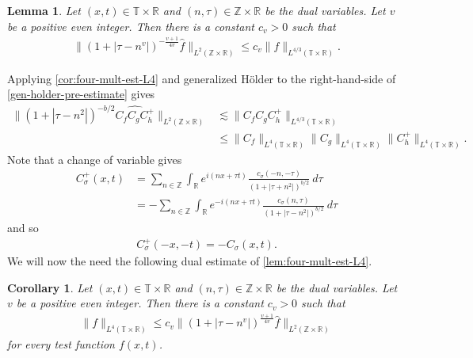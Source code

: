 \documentclass[12pt,reqno]{amsart}
\numberwithin{equation}{section}  %
\numberwithin{figure}{section}
\newcommand{\rr}{\mathbb{R}}
\newcommand{\zz}{\mathbb{Z}}
\newcommand{\ci}{\mathbb{T}}
\newcommand{\wh}{\widehat}
\theoremstyle{plain}
\newtheorem{lemma}{Lemma}
\newtheorem{corollary}{Corollary}
\theoremstyle{definition}
\theoremstyle{remark}
\begin{document}
%
%
%
%
%
%
%
%
\begin{lemma}
  \label{lem:four-mult-est-L4}
  Let $(x, t) \in \ci \times \rr $ and $(n, \tau) \in \zz \times \rr$ be 
  the dual variables. Let $v$ be a positive even integer. Then there is a 
  constant $c_v > 0$ such that
%
%
\begin{equation}
  \label{four-mult-est-L4*}
  \begin{split}
    \| \left( 1 + | \tau - n^v | 
    \right)^{-\frac{v+1}{4v}}
    \wh{f}\|_{L^2(\zz \times \rr)} \le c_v \|f \|_{L^{4/3}( \ci \times \rr)}.
  \end{split}
\end{equation}
%
%
\end{lemma}
%
%
Applying \autoref{cor:four-mult-est-L4} and generalized H\"{o}lder to the 
right-hand-side of \eqref{gen-holder-pre-estimate} gives
%
%
\begin{equation}
  \label{gen-holder-piece-1}
  \begin{split}
    \|\left( 1 + | \tau - n^{2} | \right)^{-b/2} \wh{C_f C_{ 
    g } C^+_{h}}\|_{L^2(\zz \times \rr)}
    & \lesssim  \|C_f C_{g} C^+_{h} \|_{L^{4/3}(\ci \times \rr)}
    \\
    & \le \|C_f \|_{L^4(\ci \times \rr)} \|C_{g}\|_{L^4(\ci \times \rr)} 
    \|C^+_{h}\|_{L^4(\ci \times \rr)}.
  \end{split}
\end{equation}
%
%
Note that a change of variable gives
%
%
\begin{equation*}
  \begin{split}
    C_\sigma^+(x, t)
    & = \sum_{n \in \zz} \int_\rr e^{i(nx +  \tau t)} \frac{c_\sigma\left( -n, -\tau \right)}{\left( 
    1 + | \tau + n^{2} | \right)^{b/2}} \ d \tau
    \\
    & = - \sum_{n \in \zz} \int_\rr e^{-i(nx +   \tau t )}
    \frac{c_\sigma\left( n, \tau \right)}{\left( 
    1 + | \tau - n^{2} | \right)^{b/2}} \ d \tau
  \end{split}
\end{equation*}
%
%
and so
%
%
\begin{equation*}
  \begin{split}
    C_\sigma^+(-x, -t) = -C_\sigma(x, t).
  \end{split}
\end{equation*}
%
%
We will now the need the following dual estimate of
\autoref{lem:four-mult-est-L4}.
%
\begin{corollary}
  \label{cor:four-mult-est-L4}
  Let $(x, t) \in \ci \times \rr $ and $(n, \tau) \in \zz \times \rr$ be 
  the dual variables. Let $v$ be a positive even integer. Then there is a 
  constant $c_v > 0$ such that
%
%
\begin{equation}
  \label{four-mult-est-L4}
  \begin{split}
    \|f\|_{L^4(\ci \times \rr)} \le c_v \|\left( 1 + | \tau - n^v | 
    \right)^\frac{v+1}{4v} \wh{f} \|_{L^2( \zz \times \rr)}
  \end{split}
\end{equation}
for every test function $f(x, t)$. 
%
%
%
%
\end{corollary}
\end{document}
